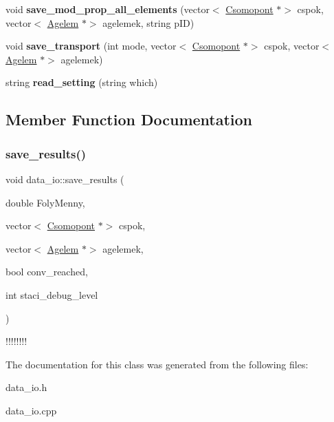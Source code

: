 \begin{DoxyCompactItemize}
void {\bfseries save\+\_\+mod\+\_\+prop\+\_\+all\+\_\+elements} (vector$<$ \hyperlink{class_csomopont}{Csomopont} $\ast$$>$ cspok, vector$<$ \hyperlink{class_agelem}{Agelem} $\ast$$>$ agelemek, string p\+ID)
\item 
\mbox{\label{classdata__io_a15627ef79b47a8afeb33f01fa15457fd}} 
void {\bfseries save\+\_\+transport} (int mode, vector$<$ \hyperlink{class_csomopont}{Csomopont} $\ast$$>$ cspok, vector$<$ \hyperlink{class_agelem}{Agelem} $\ast$$>$ agelemek)
\item 
\mbox{\label{classdata__io_a2bef52b6a28b450a5887c0483ff1e4a7}} 
string {\bfseries read\+\_\+setting} (string which)
\end{DoxyCompactItemize}


\subsection{Member Function Documentation}
\mbox{\label{classdata__io_aa0fa92e0eea74827c4c085364fc39185}} 
\subsubsection{\texorpdfstring{save\+\_\+results()}{save\_results()}}
{\footnotesize\ttfamily void data\+\_\+io\+::save\+\_\+results (\begin{DoxyParamCaption}\item[{double}]{Foly\+Menny,  }\item[{vector$<$ \hyperlink{class_csomopont}{Csomopont} $\ast$$>$}]{cspok,  }\item[{vector$<$ \hyperlink{class_agelem}{Agelem} $\ast$$>$}]{agelemek,  }\item[{bool}]{conv\+\_\+reached,  }\item[{int}]{staci\+\_\+debug\+\_\+level }\end{DoxyParamCaption})}

!!!!!!!! 

The documentation for this class was generated from the following files\+:\begin{DoxyCompactItemize}
\item 
data\+\_\+io.\+h\item 
data\+\_\+io.\+cpp\end{DoxyCompactItemize}

